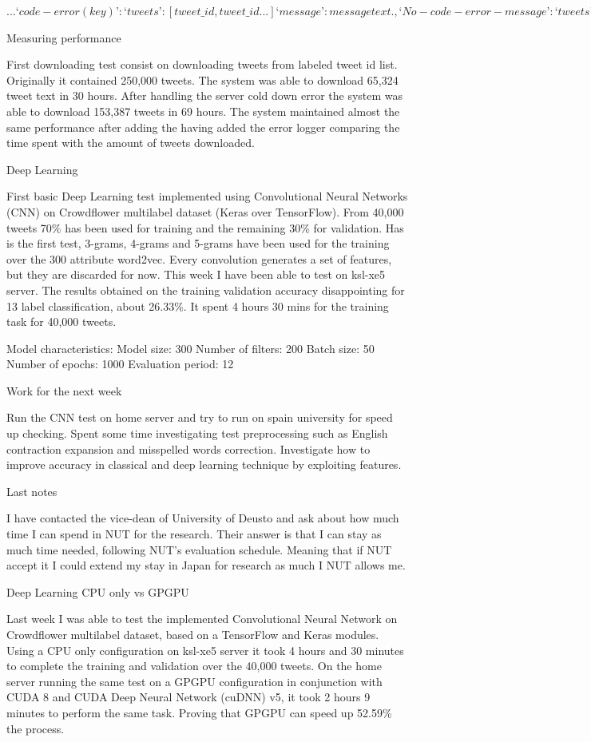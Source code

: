 $...
‘code-error (key)’: {
‘tweets’: [
	tweet\_id,
	tweet\_id
	...
]
‘message’: message text.
},
‘No-code-error-message’: {
	‘tweets’: [
	tweet\_id
]
}
...$

Measuring performance

First downloading test consist on downloading tweets from labeled tweet id list. Originally it contained 250,000 tweets. The system was able to download 65,324 tweet text in 30 hours.
After handling the server cold down error the system was able to download 153,387 tweets in 69 hours.
The system maintained almost the same performance after adding the having added the error logger comparing the time spent with the amount of tweets downloaded.

Deep Learning

First basic Deep Learning test implemented using Convolutional Neural Networks (CNN) on Crowdflower multilabel dataset (Keras over TensorFlow). From 40,000 tweets 70\% has been used for training and the remaining 30\% for validation. Has is the first test, 3-grams, 4-grams and 5-grams have been used for the training over the 300 attribute word2vec. Every convolution generates a set of features, but they are discarded for now.
This week I have been able to test on ksl-xe5 server. The results obtained on the training validation accuracy disappointing for 13 label classification, about 26.33\%. It spent 4 hours 30 mins for the training task for 40,000 tweets.

Model characteristics:
Model size: 300
Number of filters: 200
Batch size: 50
Number of epochs: 1000
Evaluation period: 12

Work for the next week

Run the CNN test on home server and try to run on spain university for speed up checking.
Spent some time investigating test preprocessing such as English contraction expansion and misspelled words correction.
Investigate how to improve accuracy in classical and deep learning technique by exploiting features.

Last notes

I have contacted the vice-dean of University of Deusto and ask about how much time I can spend in NUT for the research. Their answer is that I can stay as much time needed, following NUT’s evaluation schedule. 
Meaning that if NUT accept it I could extend my stay in Japan for research as much I NUT allows me.

Deep Learning CPU only vs GPGPU

Last week I was able to test the implemented Convolutional Neural Network on Crowdflower multilabel dataset, based on a TensorFlow and Keras modules.
Using a CPU only configuration on ksl-xe5 server it took 4 hours and 30 minutes to complete the training and validation over the 40,000 tweets.
On the home server running the same test on a GPGPU configuration in conjunction with CUDA 8 and CUDA Deep Neural Network (cuDNN) v5\cite{chetlur2014cudnn}, it took 2 hours 9 minutes to perform the same task. Proving that GPGPU can speed up 52.59\% the process.

